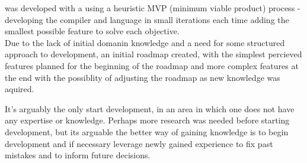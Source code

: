 \lang{} was developed with a using a heuristic MVP (minimum viable product) process -
developing the compiler and language in small iterations each time adding the
smallest possible feature to solve each objective. \\

Due to the lack of initial domanin knowledge and a need for some structured approach
to development, an initial roadmap created, with the simplest percieved features
planned for the beginning of the roadmap and more complex features at the end with
the possiblity of adjusting the roadmap as new knowledge was aquired. 

It's arguably the only start development, in an area in which one does not have any
expertise or knowledge. Perhaps more research was needed before starting development,
but its arguable the better way of gaining knowledge is to begin development and if
necessary leverage newly gained experience to fix past mistakes and to inform future
decisions. \\ 

\newpage
